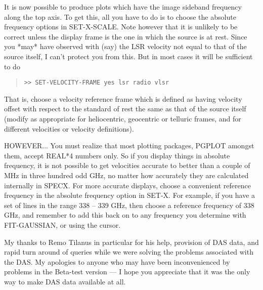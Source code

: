 \documentclass[twoside,11pt]{article}
\renewcommand{\_}{\texttt{\symbol{95}}}
\newenvironment{myquote}{\begin{quote}\begin{small}}{\end{small}\end{quote}}
\begin{document}
It is now possible to produce plots which have the image sideband
frequency along the top axis. To get this, all you have to do is to
choose the absolute frequency options in SET-X-SCALE. Note however
that it is unlikely to be correct unless the display frame is the one
in which the source is at rest. Since you *may* have observed with
(say) the LSR velocity not equal to that of the source itself, I can't
protect you from this. But in most cases it will be sufficient to do
\begin{myquote}
\begin{verbatim}
>> SET-VELOCITY-FRAME yes lsr radio vlsr
\end{verbatim}
\end{myquote}
That is, choose a velocity reference frame which is defined as having
velocity offset with respect to the standard of rest the same as that
of the source itself (modify as appropriate for heliocentric,
geocentric or telluric frames, and for different velocities or velocity
definitions).

HOWEVER... You must realize that most plotting packages, PGPLOT
amongst them, accept REAL*4 numbers only. So if you display things in
absolute frequency, it is not possible to get velocities accurate to
better than a couple of MHz in three hundred odd GHz, no matter how
accurately they are calculated internally in SPECX. For more accurate
displays, choose a convenient reference frequency in the absolute
frequency option in SET-X. For  example, if you have a set of lines
in the range 338 -- 339 GHz, then choose a reference frequency of
338 GHz, and remember to add this back on to any frequency you determine
with FIT-GAUSSIAN, or using the cursor.

My thanks to Remo Tilanus in particular for his help,
provision of DAS data, and rapid turn around of queries while we
were solving the problems associated with the DAS. My apologies to
anyone who may have been inconvenienced by problems in the Beta-test
version --- I hope you appreciate that it was the only way to make
DAS data available at all.
\end{document}

